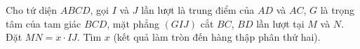 \begin{ex}
Cho tứ diện $ABCD$, gọi $I$ và $J$ lần lượt là trung điểm của $AD$ và $AC$, $G$ là trọng tâm của tam giác $BCD$, mặt phẳng $(GIJ)$ cắt $BC$, $BD$ lần lượt tại $M$ và $N$. Đặt $MN=x\cdot IJ$. Tìm $x$ (kết quả làm tròn đến hàng thập phân thứ hai).
\end{ex}

